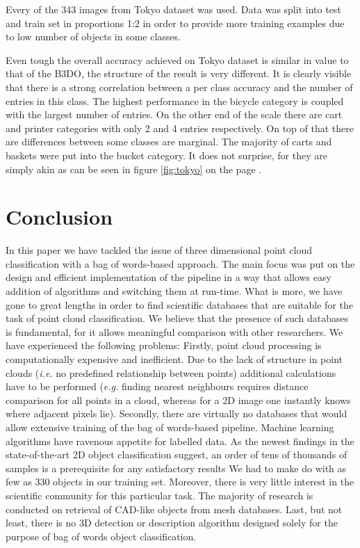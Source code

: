 	Every of the 343 images from Tokyo dataset was used. Data was split into test and train set in proportions 1:2 in order to provide more training examples due to low number of objects in some classes.
	
	Even tough the overall accuracy achieved on Tokyo dataset is similar in value to that of the B3DO, the structure of the result is very different. It is clearly visible that there is a strong correlation between a per class accuracy and the number of entries in this class. The highest performance in the bicycle category is coupled with the largest number of entries. On the other end of the scale there are cart and printer categories with only 2 and 4 entries respectively. On top of that there are differences between some classes are marginal. The majority of carts and baskets were put into the bucket category. It does not surprise, for they are simply akin as can be seen in figure \ref{fig:tokyo} on the page \pageref{fig:tokyo}.
	
\section{Conclusion}

	In this paper we have tackled the issue of three dimensional point cloud classification with a bag of words-based approach. The main focus was put on the design and efficient implementation of the pipeline in a way that allows easy addition of algorithms and switching them at run-time. What is more, we have gone to great lengths in order to find scientific databases that are suitable for the task of point cloud classification. We believe that the presence of such databases is fundamental, for it allows meaningful comparison with other researchers. We have experienced the following problems: Firstly, point cloud processing is computationally expensive and inefficient. Due to the lack of structure in point clouds (\textit{i.e.} no predefined relationship between points) additional calculations have to be performed (\textit{e.g.} finding nearest neighbours requires distance comparison for all points in a cloud, whereas for a 2D image one instantly knows where adjacent pixels lie). Secondly, there are virtually no databases that would allow extensive training of the bag of words-based pipeline. Machine learning algorithms have ravenous appetite for labelled data. As the newest findings in the state-of-the-art 2D object classification suggest, an order of tens of thousands of samples is a prerequisite for any satisfactory results We had to make do with as few as 330 objects in our training set. Moreover, there is very little interest in the scientific community for this particular task. The majority of research is conducted on retrieval of CAD-like objects from mesh databases. Last, but not least, there is no 3D detection or description algorithm designed solely for the purpose of bag of words object classification.
	
